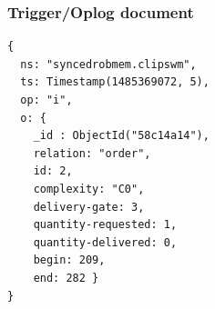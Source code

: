 \begin{frame}[fragile]
  \frametitle{Trigger/Oplog document}
\begin{lstlisting}[style=SmallJSON,
  caption={Document in the Oplog},
  label=lst:Oplog,
  framexleftmargin=2pt, xleftmargin=0pt,
 morekeywords={}, numbers=none]
{
  ns: "syncedrobmem.clipswm",
  ts: Timestamp(1485369072, 5),
  op: "i",
  o: {
    _id : ObjectId("58c14a14"),
    relation: "order",
    id: 2,
    complexity: "C0",
    delivery-gate: 3,
    quantity-requested: 1,
    quantity-delivered: 0,
    begin: 209,
    end: 282 }
}
\end{lstlisting}
\end{frame}

